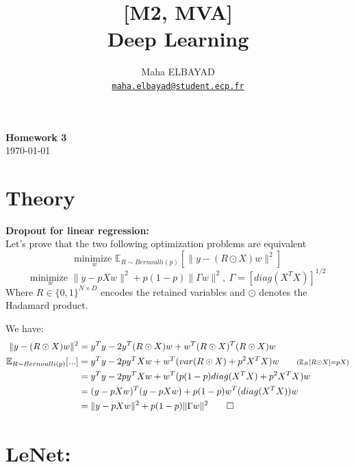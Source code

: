 \documentclass[11pt]{article}
\title{[M2, MVA]\\ Deep Learning}
\author{Maha ELBAYAD\\ \href{mailto:maha.elbayad@student.ecp.fr}{\tt maha.elbayad@student.ecp.fr}}
\date{}
\newcommand{\e}{\mathbb{E}}
\begin{document}
\maketitle
\vspace{-10pt}
\begin{center}
{\huge \bf Homework 3}\\
\today
\vspace{10pt}
\end{center}

\vspace{7pt}

\section{Theory}
	\textbf{Dropout for linear regression:}\\
	Let's prove that the two following optimization problems are equivalent
	\[\underset{w}{\text{minimize }} \e_{R\sim Bernoulli(p)}\left[\|y-(R\odot X)w\|^2\right]\tag{P1}\]
	\[\underset{w}{\text{minimize }} \|y-pXw\|^2+p(1-p)\|\Gamma w\|^2,\:\Gamma=\left[diag(X^TX)\right]^{1/2}\tag{P2}\]
	Where $R\in\{0,1\}^{N\times D}$ encodes the retained variables and $\odot$ denotes the Hadamard product.

	We have:
	\[\begin{split}
	\|y-(R\odot X)w\|^2&=y^Ty-2y^T(R\odot X)w+w^T(R\odot X)^T(R\odot X)w\\
	\e_{R\sim Bernoulli(p)}[...]&=y^Ty-2py^TXw+w^T(var(R\odot X)+p^2X^TX)w\phantom{abcd} \scriptstyle{(\e_R[R\odot X]=pX)}\\
	&=y^Ty-2py^TXw+w^T(p(1-p)diag(X^TX)+p^2X^TX)w\\
	&=(y-pXw)^T(y-pXw)+p(1-p)w^T(diag(X^TX))w\\
	&=\|y-pXw\|^2+p(1-p)\|\Gamma w\|^2\qed
	\end{split}\]
\section{LeNet:}
\end{document}
